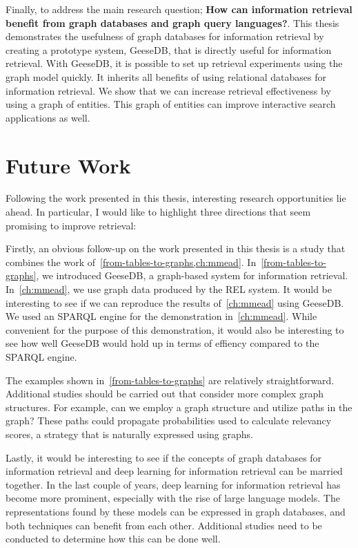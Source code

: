 Finally, to address the main research question; \textbf{How can information retrieval benefit from graph databases and graph query languages?}. This thesis demonstrates the usefulness of graph databases for information retrieval by creating a prototype system, GeeseDB, that is directly useful for information retrieval. With GeeseDB, it is possible to set up retrieval experiments using the graph model quickly. It inherits all benefits of using relational databases for information retrieval. We show that we can increase retrieval effectiveness by using a graph of entities. This graph of entities can improve interactive search applications as well.    

\section{Future Work}
Following the work presented in this thesis, interesting research opportunities lie ahead. In particular, I would like to highlight three directions that seem promising to improve retrieval:

Firstly, an obvious follow-up on the work presented in this thesis is a study that combines the work of~\cref{from-tables-to-graphs,ch:mmead}. In~\cref{from-tables-to-graphs}, we introduced GeeseDB, a graph-based system for information retrieval. In~\cref{ch:mmead}, we use graph data produced by the REL system.  It would be interesting to see if we can reproduce the results of~\cref{ch:mmead} using GeeseDB. We used an SPARQL engine for the demonstration in~\cref{ch:mmead}. While convenient for the purpose of this demonstration, it would also be interesting to see how well GeeseDB would hold up in terms of effiency compared to the SPARQL engine. 

The examples shown in~\cref{from-tables-to-graphs} are relatively straightforward. Additional studies should be carried out that consider more complex graph structures. For example, can we employ a graph structure and utilize paths in the graph? These paths could propagate probabilities used to calculate relevancy scores, a strategy that is naturally expressed using graphs.

Lastly, it would be interesting to see if the concepts of graph databases for information retrieval and deep learning for information retrieval can be married together. In the last couple of years, deep learning for information retrieval has become more prominent, especially with the rise of large language models. The representations found by these models can be expressed in graph databases, and both techniques can benefit from each other. Additional studies need to be conducted to determine how this can be done well. 
